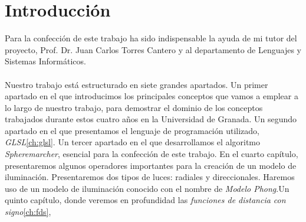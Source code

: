 \chapter*{Introducción}
Para la confección de este trabajo ha sido indispensable la ayuda de mi tutor del proyecto, Prof. Dr. Juan Carlos Torres Cantero y al departamento de Lenguajes y Sistemas Informáticos.\\\\
Nuestro trabajo está estructurado en siete grandes apartados. Un primer apartado en el que introducimos los principales conceptos que vamos a emplear a lo largo de nuestro trabajo, para demostrar el dominio de los conceptos trabajados durante estos cuatro años en la Universidad de Granada. Un segundo apartado en el que presentamos el lenguaje de programación utilizado, \textit{GLSL}\ref{ch:glsl}. Un tercer apartado en el que desarrollamos el algoritmo \textit{Spheremarcher}, esencial para la confección de este trabajo. En el cuarto capítulo, presentaremos algunos operadores importantes para la creación de un modelo de iluminación. Presentaremos dos tipos de luces: radiales y direccionales. Haremos uso de un modelo de iluminación conocido con el nombre de \textit{Modelo Phong}.Un quinto capítulo, donde veremos en profundidad las \textit{funciones de distancia con signo}\ref{ch:fds},  